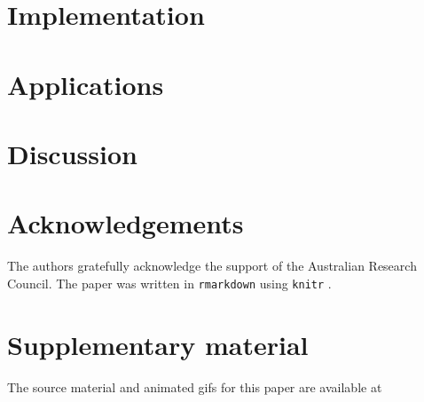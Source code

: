 \documentclass[]{interact}
\theoremstyle{plain}%
\theoremstyle{definition}
\theoremstyle{remark}
\begin{document}
\hypertarget{sec:implementation}{%
\section{Implementation}\label{sec:implementation}}

\hypertarget{sec:examples}{%
\section{Applications}\label{sec:examples}}

\hypertarget{sec:discussion}{%
\section{Discussion}\label{sec:discussion}}

\hypertarget{acknowledgements}{%
\section*{Acknowledgements}\label{acknowledgements}}

The authors gratefully acknowledge the support of the Australian
Research Council. The paper was written in \texttt{rmarkdown}
\citep{rmarkdown} using \texttt{knitr} \citep{knitr}.

\hypertarget{supplementary-material}{%
\section*{Supplementary material}\label{supplementary-material}}

The source material and animated gifs for this paper are available at



\end{document}
